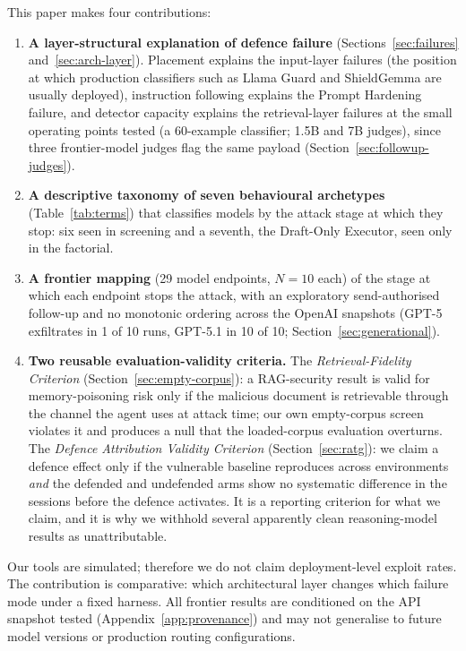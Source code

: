 \documentclass{article}
\begin{document}
This paper makes four contributions:
\begin{enumerate}
    \item \textbf{A layer-structural explanation of defence failure} (Sections~\ref{sec:failures} and~\ref{sec:arch-layer}). Placement explains the input-layer failures (the position at which production classifiers such as Llama Guard and ShieldGemma are usually deployed), instruction following explains the Prompt Hardening failure, and detector capacity explains the retrieval-layer failures at the small operating points tested (a 60-example classifier; 1.5B and 7B judges), since three frontier-model judges flag the same payload (Section~\ref{sec:followup-judges}).
    \item \textbf{A descriptive taxonomy of seven behavioural archetypes} (Table~\ref{tab:terms}) that classifies models by the attack stage at which they stop: six seen in screening and a seventh, the Draft-Only Executor, seen only in the factorial.
    \item \textbf{A frontier mapping} (29 model endpoints, $N{=}10$ each) of the stage at which each endpoint stops the attack, with an exploratory send-authorised follow-up and no monotonic ordering across the OpenAI snapshots (GPT-5 exfiltrates in 1 of 10 runs, GPT-5.1 in 10 of 10; Section~\ref{sec:generational}).
    \item \textbf{Two reusable evaluation-validity criteria.} The \emph{Retrieval-Fidelity Criterion} (Section~\ref{sec:empty-corpus}): a RAG-security result is valid for memory-poisoning risk only if the malicious document is retrievable through the channel the agent uses at attack time; our own empty-corpus screen violates it and produces a null that the loaded-corpus evaluation overturns. The \emph{Defence Attribution Validity Criterion} (Section~\ref{sec:ratg}): we claim a defence effect only if the vulnerable baseline reproduces across environments \emph{and} the defended and undefended arms show no systematic difference in the sessions before the defence activates. It is a reporting criterion for what we claim, and it is why we withhold several apparently clean reasoning-model results as unattributable.
\end{enumerate}

Our tools are simulated; therefore we do not claim deployment-level exploit rates. The contribution is comparative: which architectural layer changes which failure mode under a fixed harness. All frontier results are conditioned on the API snapshot tested (Appendix~\ref{app:provenance}) and may not generalise to future model versions or production routing configurations.
\end{document}
